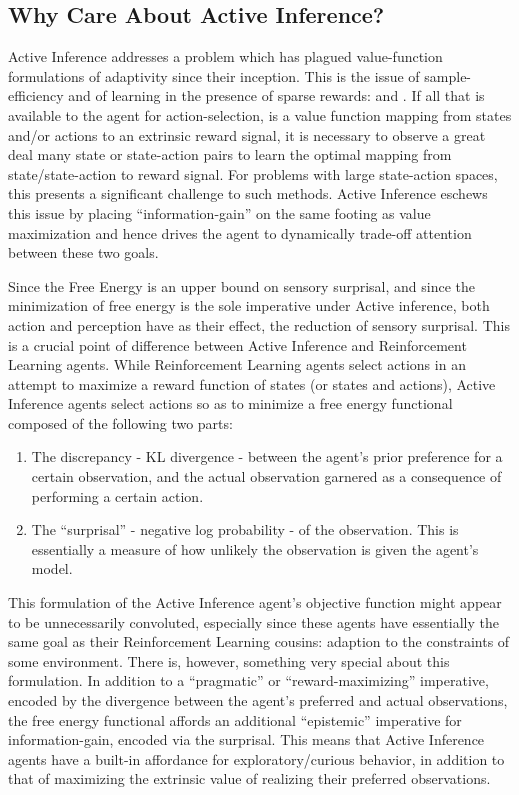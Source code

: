 \documentclass[onecolumn]{IEEEtran}
\begin{document}
\subsection{Why Care About Active Inference?}

Active Inference addresses a problem which has plagued value-function formulations of adaptivity since their inception. This is the issue of sample-efficiency and of learning in the presence of sparse rewards: \textcite{RLflawed} and \textcite{RL-Real-World-Challenges}. If all that is available to the agent for action-selection, is a value function mapping from states and/or actions to an extrinsic reward signal, it is necessary to observe a great deal many state or state-action pairs to learn the optimal mapping from state/state-action to reward signal. For problems with large state-action spaces, this presents a significant challenge to such methods. Active Inference eschews this issue by placing ``information-gain'' on the same footing as value maximization and hence drives the agent to dynamically trade-off attention between these two goals. 

Since the Free Energy is an upper bound on sensory surprisal, and since the minimization of free energy is the sole imperative under Active inference, both action and perception have as their effect, the reduction of sensory surprisal. This is a crucial point of difference between Active Inference and Reinforcement Learning agents. While Reinforcement Learning agents select actions in an attempt to maximize a reward function of states (or states and actions), Active Inference agents select actions so as to minimize a free energy functional composed of the following two parts: 

\begin{enumerate}
	\item The discrepancy - KL divergence - between the agent's prior preference for a certain observation, and the actual observation garnered as a consequence of performing a certain action.
	\item The ``surprisal'' - negative log probability - of the observation. This is essentially a measure of how unlikely the observation is given the agent's model.
\end{enumerate}

This formulation of the Active Inference agent's objective function might appear to be unnecessarily convoluted, especially since these agents have essentially the same goal as their Reinforcement Learning cousins: adaption to the constraints of some environment. There is, however, something very special about this formulation. In addition to a ``pragmatic'' or ``reward-maximizing'' imperative, encoded by the divergence between the agent's preferred and actual observations, the free energy functional affords an additional ``epistemic'' imperative for information-gain, encoded via the surprisal. This means that Active Inference agents have a built-in affordance for exploratory/curious behavior, in addition to that of maximizing the extrinsic value of realizing their preferred observations.
\end{document}
